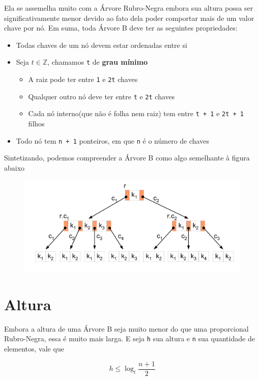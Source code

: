 Ela se assemelha muito com a Árvore Rubro-Negra embora sua altura possa ser significativamente menor devido ao fato dela poder comportar mais de um valor chave por nó. Em suma, toda Árvore B deve ter as seguintes propriedades:

\begin{itemize}
	\item Todas chaves de um nó devem estar ordenadas entre si
	\item Seja ${t \in \mathbb{Z}}$, chamamos \texttt{t} de \textbf{grau mínimo}
		\begin{itemize}
			\item A raiz pode ter entre \texttt{1} e \texttt{2t} chaves
			\item Qualquer outro nó deve ter entre \texttt{t} e \texttt{2t} chaves
			\item Cada nó interno(que não é folha nem raiz) tem entre \texttt{t + 1} e \texttt{2t + 1} filhos
		\end{itemize}
	\item Todo nó tem \texttt{n + 1} ponteiros, em que \texttt{n} é o número de chaves
\end{itemize}

Sintetizando, podemos compreender a Árvore B como algo semelhante à figura abaixo


\begin{figure}[!ht]
	\centering
	\includegraphics[scale=0.3]{figures/btree.png}
\end{figure}

\section*{Altura}

Embora a altura de uma Árvore B seja muito menor do que uma proporcional Rubro-Negra, essa é muito mais larga. E seja \texttt{h} sua altura e \texttt{n} sua quantidade de elementos, vale que

\begin{equation*}
	h \leq \log_t {\frac{n + 1}{2}}
\end{equation*}

